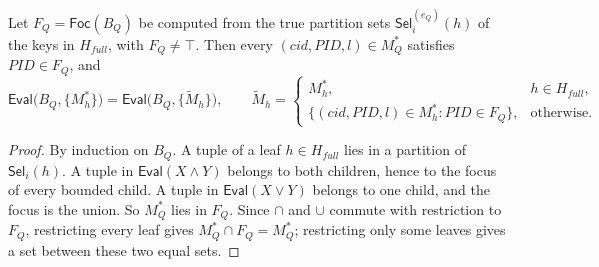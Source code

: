 

\begin{lemma}
Let $F_Q = \mathsf{Foc}(B_Q)$ be computed from the true partition sets $\mathsf{Sel}_i^{(e_Q)}(h)$ of the
keys in $H_{full}$, with $F_Q \ne \top$. Then every $(cid, PID, l) \in M_Q^{*}$ satisfies $PID \in F_Q$,
and
\begin{equation}
\mathsf{Eval}\big(B_Q, \{M_h^{*}\}\big) = \mathsf{Eval}\big(B_Q, \{\tilde{M}_h\}\big), \qquad
\tilde{M}_h =
\begin{cases}
M_h^{*}, & h \in H_{full},\\
\{(cid,PID,l) \in M_h^{*} : PID \in F_Q\}, & \text{otherwise.}
\end{cases}
\end{equation}
\end{lemma}
\begin{proof}
By induction on $B_Q$. A tuple of a leaf $h \in H_{full}$ lies in a partition of $\mathsf{Sel}_i(h)$.
A tuple in $\mathsf{Eval}(X \wedge Y)$ belongs to both children, hence to the focus of every bounded
child. A tuple in $\mathsf{Eval}(X \vee Y)$ belongs to one child, and the focus is the union. So
$M_Q^{*}$ lies in $F_Q$. Since $\cap$ and $\cup$ commute with restriction to $F_Q$, restricting every
leaf gives $M_Q^{*} \cap F_Q = M_Q^{*}$; restricting only some leaves gives a set between these two
equal sets.
\end{proof}


